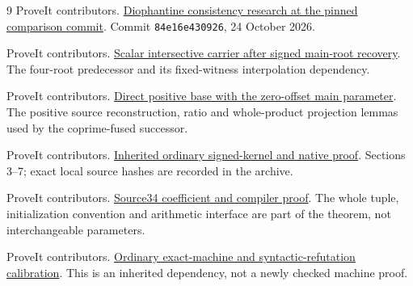 \begin{thebibliography}{9}
ProveIt contributors.
\href{https://github.com/VladimirReshetnikov/ProveIt/tree/84e16e43092614bae262ca59651cb9d77e31a255/Computability/DiophantineConsistency}{Diophantine consistency research at the pinned comparison commit}.
Commit \texttt{84e16e430926}, 24 October 2026.

ProveIt contributors.
\href{https://github.com/VladimirReshetnikov/ProveIt/blob/84e16e43092614bae262ca59651cb9d77e31a255/Computability/DiophantineConsistency/candidates/scalar-carrier12/PROOF.md}{Scalar intersective carrier after signed main-root recovery}.
The four-root predecessor and its fixed-witness interpolation dependency.

ProveIt contributors.
\href{https://github.com/VladimirReshetnikov/ProveIt/blob/84e16e43092614bae262ca59651cb9d77e31a255/Computability/DiophantineConsistency/candidates/ten-positive-direct-zero-offset/PROOF.md}{Direct positive base with the zero-offset main parameter}.
The positive source reconstruction, ratio and whole-product projection
lemmas used by the coprime-fused successor.

ProveIt contributors.
\href{https://github.com/VladimirReshetnikov/ProveIt/blob/9a33342a03d19cf5b061b2083c6b5d3f27f752ed/Computability/DiophantineConsistency/con-zfc-diophantine-forms/36-small-tuple/proofs/INHERITED_ORDINARY_PROOF.md}{Inherited ordinary signed-kernel and native proof}.
Sections 3--7; exact local source hashes are recorded in the archive.

ProveIt contributors.
\href{https://github.com/VladimirReshetnikov/ProveIt/blob/9a33342a03d19cf5b061b2083c6b5d3f27f752ed/Computability/DiophantineConsistency/con-zfc-diophantine-forms/34-integer14/coefficients/COEFFICIENT_PROOF.md}{Source34 coefficient and compiler proof}.
The whole tuple, initialization convention and arithmetic interface are
part of the theorem, not interchangeable parameters.

ProveIt contributors.
\href{https://github.com/VladimirReshetnikov/ProveIt/blob/9a33342a03d19cf5b061b2083c6b5d3f27f752ed/Computability/BusyBeaver/Research/ZFC/candidate-k215/proof.md}{Ordinary exact-machine and syntactic-refutation calibration}.
This is an inherited dependency, not a newly checked machine proof.
\end{thebibliography}
